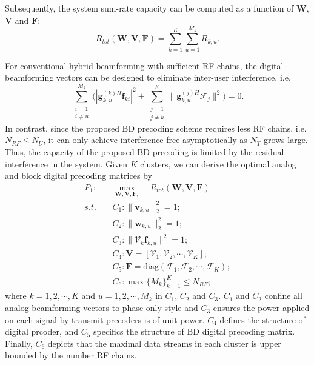 \documentclass[conference]{IEEEtran}
\begin{document}
{Subsequently, the system sum-rate capacity can be computed as a function of $\bm{W}$, ${\bm V}$ and ${\bm F}$:
\begin{equation}
R_{tot}(\bm{W}, \bm{V}, \bm{F})=\sum_{k=1}^{K}\sum_{u=1}^{M_k}R_{k,u}.
\end{equation}

For conventional hybrid beamforming with sufficient RF chains, the digital beamforming vectors can be designed to eliminate inter-user interference, i.e.
{\color{red}\begin{equation}
 \displaystyle\sum_{\substack{i=1 \\ i\neq u}}^{M_k}\Big(|{\bm{g}}_{k,u}^{(k)H}\bm{f}_{ki}|^2+\displaystyle\sum_{\substack{j=1\\j\neq k}}^{K}\|\bm{g}_{k,u}^{(j)H}\bm{\mathcal{F}}_j\|^2\Big)={0}. 
\end{equation}
}
In contrast, since the proposed BD precoding scheme requires less RF chains, i.e. $N_{RF}\leq N_U$, it can only achieve interference-free asymptotically as $N_T$ grows large. Thus, the capacity of the proposed BD precoding is limited by the residual interference in the system. Given $K$ clusters, we can derive the optimal analog and block digital precoding matrices by
\begin{align}\label{eq:maxsumrate}
P_1: \quad&\max_{\bm W, \bm{V},\bm F, }\quad R_{tot}(\bm{W}, \bm{V}, \bm{F})\\ \nonumber
s.t. \quad&C_1: \|\bm{v}_{k,u}\|^2_2=1; \\
&C_2: \|\bm{w}_{k,u}\|^2_2=1;\nonumber\\
&C_3: \|\bm{\mathcal{V}}_k \bm{f}_{k,u}\|^2=1;\nonumber\\
&C_4: \bm{V} = [\bm{\mathcal{V}}_1, \bm{\mathcal{V}}_2, \cdots, \bm{\mathcal{V}}_K];\nonumber\\
&C_5: \bm{F} = \text{diag}(\bm{\mathcal{F}}_1, \bm{\mathcal{F}}_2, \cdots, \bm{\mathcal{F}}_{K});\nonumber\\
&C_6: \max \{M_k\}_{k=1}^K \leq N_{RF};\nonumber
\end{align}
where $k=1,2,\cdots,K$ and $u = 1, 2, \cdots, M_k$ in $C_1$, $C_2$ and $C_3$. $C_1$ and $C_2$ confine all analog beamforming vectors to phase-only style and $C_3$ ensures the power applied on each signal by transmit precoders is of unit power. $C_4$ defines the structure of digital prcoder, and $C_5$ specifics the structure of BD digital precoding matrix. Finally,  $C_6$ depicts that the maximal data streams in each cluster is upper bounded by the number RF chains. 

}
\end{document}
